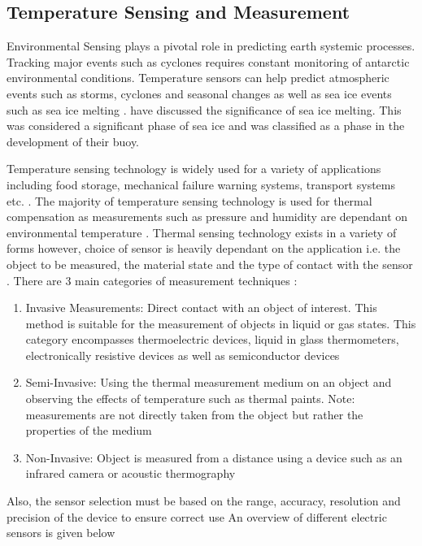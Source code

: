\subsection{Temperature Sensing and Measurement}

Environmental Sensing plays a pivotal role in predicting earth systemic processes. Tracking major events such as cyclones \cite{vichi2019effects} requires constant monitoring of antarctic environmental conditions. Temperature sensors can help predict atmospheric events such as storms, cyclones and seasonal changes as well as sea ice events such as sea ice melting \cite{kohout2015device} \cite{doble2017robust}. \textcite{doble2017robust} have discussed the significance of sea ice melting. This was considered a significant phase of sea ice and was classified as a phase in the development of their buoy. \par 

Temperature sensing technology is widely used for a variety of applications including food storage, mechanical failure warning systems, transport systems etc. \cite{awtrey2002environmental}. The majority of temperature sensing technology is used for thermal compensation as measurements such as pressure and humidity are dependant on environmental temperature \cite{mansoor2015silicon}. Thermal sensing technology exists in a variety of forms however, choice of sensor is heavily dependant on the application i.e. the object to be measured, the material state and the type of contact with the sensor \cite{mansoor2015silicon}\cite{childs2000review}. There are 3 main categories of measurement techniques \cite{childs2000review}:
\begin{enumerate}
    \item Invasive Measurements: Direct contact with an object of interest. This method is suitable for the measurement of objects in liquid or gas states. This category encompasses thermoelectric devices, liquid in glass thermometers, electronically resistive devices as well as semiconductor devices \cite{mansoor2015silicon}
    \item Semi-Invasive: Using the thermal measurement medium on an object and observing the effects of temperature such as thermal paints. Note: measurements are not directly taken from the object but rather the properties of the medium
    \item Non-Invasive: Object is measured from a distance using a device such as an infrared camera or acoustic thermography
\end{enumerate}
Also, the sensor selection must be based on the range, accuracy, resolution and precision of the device to ensure correct use An overview of different electric sensors is given below \cite{childs2000review}
